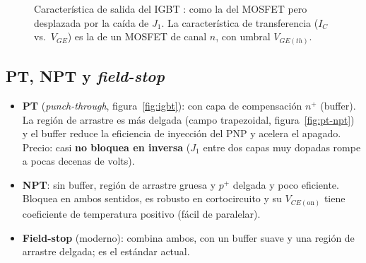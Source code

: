 \begin{figure}[H]
\centering
{}
\caption{Característica de salida del IGBT : como la del MOSFET pero desplazada por la
caída de $J_1$. La característica de transferencia ($I_C$ vs.\ $V_{GE}$) es la de un MOSFET de canal
$n$, con umbral $V_{GE(th)}$.}
\label{fig:igbt-salida}
\end{figure}

\subsection{PT, NPT y \emph{field-stop}}

\begin{itemize}
  \item \textbf{PT} (\emph{punch-through}, figura~\ref{fig:igbt}): con capa de compensación $n^+$
  (buffer). La región de arrastre es más delgada (campo trapezoidal, figura~\ref{fig:pt-npt}) y el
  buffer reduce la eficiencia de inyección del PNP y acelera el apagado. Precio: casi \textbf{no
  bloquea en inversa} ($J_1$ entre dos capas muy dopadas rompe a pocas decenas de volts).
  \item \textbf{NPT}: sin buffer, región de arrastre gruesa y $p^+$ delgada y poco eficiente.
  Bloquea en ambos sentidos, es robusto en cortocircuito y su $V_{CE(\mathrm{on})}$ tiene coeficiente
  de temperatura positivo (fácil de paralelar).
  \item \textbf{Field-stop} (moderno): combina ambos, con un buffer suave y una región de arrastre
  delgada; es el estándar actual.
\end{itemize}

